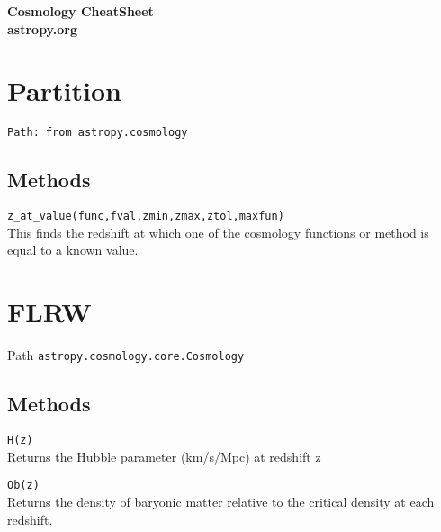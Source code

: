\def\BibTeX{{\rm B\kern-.05em{\sc i\kern-.025em b}\kern-.08em
    T\kern-.1667em\lower.7ex\hbox{E}\kern-.125emX}}

\setcounter{secnumdepth}{0}


\setlength{\parindent}{0pt}
\setlength{\parskip}{0pt plus 0.5ex}


   \newcommand{\tab}{\hspace*{2em}}



\raggedright
\footnotesize
\begin{multicols}{3}


\setlength{\premulticols}{1pt}
\setlength{\postmulticols}{1pt}
\setlength{\multicolsep}{1pt}
\setlength{\columnsep}{2pt}

\begin{center}
     \Large{\textbf{Cosmology CheatSheet \\ astropy.org}} \\
\end{center}
\section{Partition}
\verb!Path: from astropy.cosmology!\\
\subsection{Methods}
\verb!z_at_value(func,fval,zmin,zmax,ztol,maxfun)! \\
This finds the redshift at which one of the cosmology functions or method is equal to a known value.

\section{FLRW}
Path \verb!astropy.cosmology.core.Cosmology!\\

\subsection{Methods}
\verb!H(z)! \\
Returns the Hubble parameter (km/s/Mpc) at redshift z

\verb!Ob(z)!\\
Returns the density of baryonic matter relative to the critical density at each redshift.


\end{multicols}
